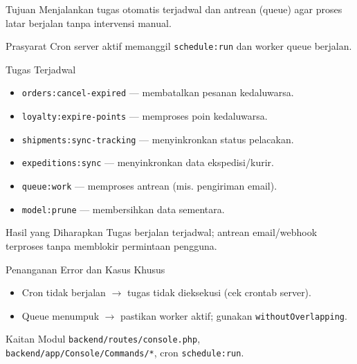 
\begin{flowsection}{Tujuan}
Menjalankan tugas otomatis terjadwal dan antrean (queue) agar proses latar
berjalan tanpa intervensi manual.
\end{flowsection}

\begin{flowsection}{Prasyarat}
Cron server aktif memanggil \texttt{schedule:run} dan worker queue berjalan.
\end{flowsection}

\begin{flowsection}{Tugas Terjadwal}
\begin{itemize}
  \item \texttt{orders:cancel-expired} --- membatalkan pesanan kedaluwarsa.
  \item \texttt{loyalty:expire-points} --- memproses poin kedaluwarsa.
  \item \texttt{shipments:sync-tracking} --- menyinkronkan status pelacakan.
  \item \texttt{expeditions:sync} --- menyinkronkan data ekspedisi/kurir.
  \item \texttt{queue:work} --- memproses antrean (mis. pengiriman email).
  \item \texttt{model:prune} --- membersihkan data sementara.
\end{itemize}
\end{flowsection}


\begin{flowsection}{Hasil yang Diharapkan}
Tugas berjalan terjadwal; antrean email/webhook terproses tanpa memblokir permintaan pengguna.
\end{flowsection}

\begin{flowsection}{Penanganan Error dan Kasus Khusus}
\begin{itemize}
  \item Cron tidak berjalan $\rightarrow$ tugas tidak dieksekusi (cek crontab server).
  \item Queue menumpuk $\rightarrow$ pastikan worker aktif; gunakan \texttt{withoutOverlapping}.
\end{itemize}
\end{flowsection}

\begin{flowsection}{Kaitan Modul}
\texttt{backend/routes/console.php}, \texttt{backend/app/Console/Commands/*},
cron \texttt{schedule:run}.
\end{flowsection}

